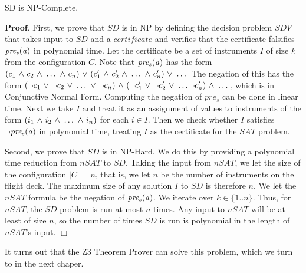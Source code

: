 \begin{theorem}[NP]
	SD is NP-Complete.
\end{theorem}
$\mathbf{Proof.}$ First, we prove that $SD$ is in NP by defining the decision problem $\mathit{SDV}$ that takes input to $\mathit{SD}$ and a $\mathit{certificate}$ and verifies that the certificate falsifies $\mathit{pre_s}(\mathit{a})$ in polynomial time. Let the certificate be a set of instruments $I$ of size $k$ from the configuration $C$. Note that $\mathit{pre_s}(\mathit{a})$ has the form $(c_1 {\ \wedge \ } c_2 {\ \wedge \ } \dots {\ \wedge \ } c_n) {\ \vee \ } (c_1' {\ \wedge \ } c_2' {\ \wedge \ } \dots {\ \wedge \ } c_n') {\ \vee \ } \dots$ The negation of this has the form $({\neg} c_1 {\ \vee \ } {\neg} c_2 {\ \vee \ } \dots {\ \vee \ } {\neg} c_n) {\ \wedge \ } ({\neg} c_1' {\ \vee \ } {\neg} c_2' {\ \vee \ } \dots {\neg} c_n') {\ \wedge \ } \dots$, which is in Conjunctive Normal Form. Computing the negation of $\mathit{pre_s}$ can be done in linear time. Next we take $I$ and treat it as an assignment of values to instruments of the form $(i_1 {\ \wedge \ } i_2 {\ \wedge \ } \dots {\ \wedge \ } i_n)$ for each $i \in I$. Then we check whether $I$ satisfies ${\neg} \mathit{pre_s}(\mathit{a})$ in polynomial time, treating $I$ as the certificate for the $SAT$ problem.

Second, we prove that $SD$ is in NP-Hard. We do this by providing a polynomial time reduction from $nSAT$ to $SD$. Taking the input from $nSAT$, we let the size of the configuration $|C| = n$, that is, we let $n$ be the number of instruments on the flight deck. The maximum size of any solution $I$ to $SD$ is therefore $n$. We let the $nSAT$ formula be the negation of $\mathit{pre_s}(\mathit{a})$. We iterate over $k \in \{1..n\}$. Thus, for $nSAT$, the $SD$ problem is run at most $n$ times. Any input to $nSAT$ will be at least of size $n$, so the number of times $SD$ is run is polynomial in the length of $nSAT$'s input. $\Box$

It turns out that the Z3 Theorem Prover can solve this problem, which we turn to in the next chaper.
	
